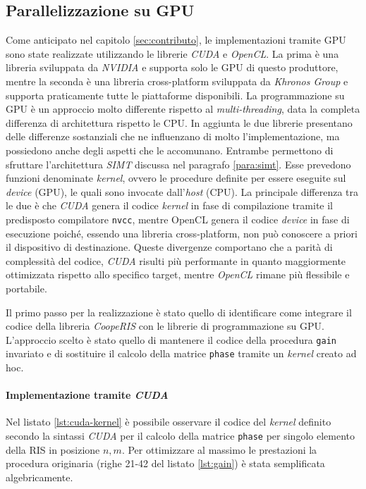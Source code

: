 \subsection{Parallelizzazione su GPU}
\label{subsec:cuda}

Come anticipato nel capitolo \ref{sec:contributo}, le implementazioni tramite
GPU sono state realizzate utilizzando le librerie \textit{CUDA}\cite{cuda} e
\textit{OpenCL}\cite{opencl}. La prima è una libreria sviluppata da \textit{NVIDIA}
e supporta solo le GPU di questo produttore, mentre la seconda è una libreria cross-platform
sviluppata da \textit{Khronos Group} e supporta praticamente tutte le
piattaforme disponibili. La programmazione su GPU è un approccio molto differente
rispetto al \textit{multi-threading}, data la completa differenza di architettura
rispetto le CPU. In aggiunta le due librerie presentano delle differenze
sostanziali che ne influenzano di molto l'implementazione, ma possiedono anche degli
aspetti che le accomunano. Entrambe permettono di sfruttare l'architettura
\textit{SIMT} discussa nel paragrafo \ref{para:simt}. Esse prevedono funzioni
denominate \textit{kernel}, ovvero le procedure definite per essere eseguite sul
\textit{device} (GPU), le quali sono invocate dall'\textit{host} (CPU). La
principale differenza tra le due è che \textit{CUDA} genera il codice \textit{kernel}
in fase di compilazione tramite il predisposto compilatore \texttt{nvcc}, mentre
OpenCL genera il codice \textit{device} in fase di esecuzione poiché, essendo
una libreria cross-platform, non può conoscere a priori il dispositivo di destinazione.
Queste divergenze comportano che a parità di complessità del codice, \textit{CUDA}
risulti più performante in quanto maggiormente ottimizzata rispetto allo
specifico target, mentre \textit{OpenCL} rimane più flessibile e portabile\cite{cudavsopencl}.

Il primo passo per la realizzazione è stato quello di identificare come integrare
il codice della libreria \textit{CoopeRIS} con le librerie di programmazione su
GPU. L'approccio scelto è stato quello di mantenere il codice della procedura \texttt{gain}
invariato e di sostituire il calcolo della matrice \texttt{phase} tramite un \textit{kernel}
creato ad hoc.

\paragraph{Implementazione tramite \textit{CUDA}}
\label{para:cuda}

Nel listato \ref{lst:cuda-kernel} è possibile osservare il codice del \textit{kernel}
definito secondo la sintassi \textit{CUDA} per il calcolo della matrice \texttt{phase}
per singolo elemento della RIS in posizione $n, m$. Per ottimizzare al massimo
le prestazioni la procedura originaria (righe 21-42 del listato \ref{lst:gain})
è stata semplificata algebricamente.

